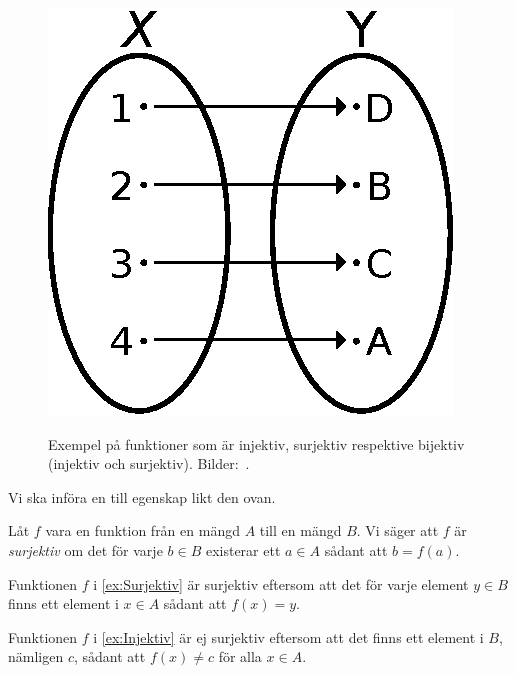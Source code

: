 \begin{figure}
\begin{minipage}{0.3\textwidth}
    \label{fig:Surjektion}
  \end{minipage}
  \hfill
  \begin{minipage}{0.3\textwidth}
    \includegraphics[width=\textwidth]{figs/bijection.eps}
    \label{fig:Bijektion}
  \end{minipage}
  \caption{%
    Exempel på funktioner som är injektiv, surjektiv respektive bijektiv 
    (injektiv och surjektiv).
    Bilder:~\cite{Wikipedia2013Injection}.
  }
\end{figure}

Vi ska införa en till egenskap likt den ovan.
\begin{definition}\label{def:Surjektiv}
  Låt \(f\) vara en funktion från en mängd \(A\) till en mängd \(B\).
  Vi säger att \(f\) är \emph{surjektiv} om det för varje \(b\in B\)
  existerar ett \(a\in A\) sådant att \(b=f(a)\).
\end{definition}
\begin{example}
  Funktionen \(f\) i \cref{ex:Surjektiv} är surjektiv eftersom att
  det för varje element \(y\in B\) finns ett element i \(x\in A\) sådant
  att \(f(x)=y\).
\end{example}
\begin{example}
  Funktionen \(f\) i \cref{ex:Injektiv} är ej surjektiv eftersom att
  det finns ett element i \(B\), nämligen \(c\), sådant att
  \(f(x)\neq c\) för alla \(x\in A\).
\end{example}

